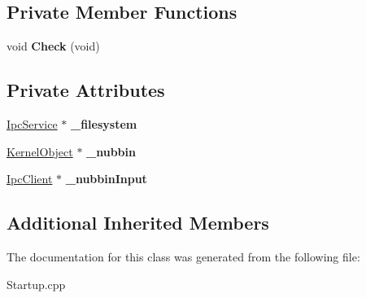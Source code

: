 \subsection*{Private Member Functions}
\begin{DoxyCompactItemize}
\item 
\mbox{\label{class_startup___internal_1_1_waiting_for_filesystem_ad7cf92741cd2ac56a70a2ee462765b66}} 
void {\bfseries Check} (void)
\end{DoxyCompactItemize}
\subsection*{Private Attributes}
\begin{DoxyCompactItemize}
\item 
\mbox{\label{class_startup___internal_1_1_waiting_for_filesystem_a0a67182952f53a69465d1fee4dd77548}} 
\hyperlink{class_ipc_service}{Ipc\+Service} $\ast$ {\bfseries \+\_\+filesystem}
\item 
\mbox{\label{class_startup___internal_1_1_waiting_for_filesystem_a56ea3d4605362e4183dc58286a9ef724}} 
\hyperlink{class_kernel_object}{Kernel\+Object} $\ast$ {\bfseries \+\_\+nubbin}
\item 
\mbox{\label{class_startup___internal_1_1_waiting_for_filesystem_a432e13f8dc58f76bfd286dbe778a888a}} 
\hyperlink{class_ipc_client}{Ipc\+Client} $\ast$ {\bfseries \+\_\+nubbin\+Input}
\end{DoxyCompactItemize}
\subsection*{Additional Inherited Members}


The documentation for this class was generated from the following file\+:\begin{DoxyCompactItemize}
\item 
Startup.\+cpp\end{DoxyCompactItemize}
